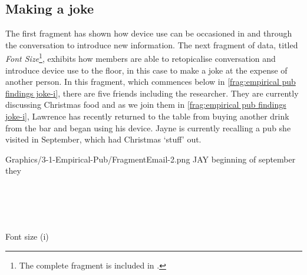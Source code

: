 


\crpagebreak\subsection{Making a joke}\label{sec:empirical pub findings joke}
\begin{revisedsubmission}
The first fragment has shown how device use can be occasioned in and through the conversation to introduce new information.
The next fragment of data, titled \textit{Font Size}\footnote{The complete fragment is included in .}, exhibits how members are able to retopicalise conversation and introduce device use to the floor, in this case to make a joke at the expense of another person.
In this fragment, which commences below in \autoref{frag:empirical pub findings joke-i}, there are five friends including the researcher.
They are currently discussing Christmas food and as we join them in \autoref{frag:empirical pub findings joke-i}, Lawrence has recently returned to the table from buying another drink from the bar and began using his device.
Jayne is currently recalling a pub she visited in September, which had Christmas `stuff' out.

\begin{inlinefrag*}
    {
    \begin{transcript*}
           {Graphics/3-1-Empirical-Pub/FragmentEmail-2.png}
        \by JAY {beginning of september they} \\
         \\
         \\
         \\
         \\
    \end{transcript*}
    \caption{Font size (i)}\label{frag:empirical pub findings joke-i}
    }
\end{inlinefrag*}


\end{revisedsubmission}
